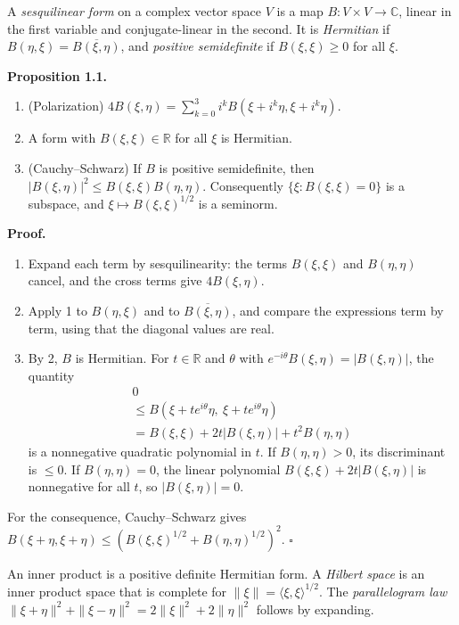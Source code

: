 \documentclass[
  english,
  11pt,
  a4paper,
]{article}
\providecommand{\tightlist}{%
  \setlength{\itemsep}{0pt}\setlength{\parskip}{0pt}}
\begin{document}
A \emph{sesquilinear form} on a complex vector space \(V\) is a map
\(B:V\times V\to\mathbb C\), linear in the first variable and
conjugate-linear in the second. It is \emph{Hermitian} if
\(B(\eta,\xi)=\overline{B(\xi,\eta)}\), and \emph{positive semidefinite}
if \(B(\xi,\xi)\ge0\) for all \(\xi\).

\textbf{Proposition 1.1.}

\begin{enumerate}
\tightlist
\item
  (Polarization)
  \(4B(\xi,\eta)=\sum_{k=0}^3i^kB(\xi+i^k\eta,\xi+i^k\eta)\).
\item
  A form with \(B(\xi,\xi)\in\mathbb R\) for all \(\xi\) is Hermitian.
\item
  (Cauchy--Schwarz) If \(B\) is positive semidefinite, then
  \(|B(\xi,\eta)|^2\le B(\xi,\xi)B(\eta,\eta)\). Consequently
  \(\{\xi:B(\xi,\xi)=0\}\) is a subspace, and
  \(\xi\mapsto B(\xi,\xi)^{1/2}\) is a seminorm.
\end{enumerate}

\textbf{Proof.}

\begin{enumerate}
\tightlist
\item
  Expand each term by sesquilinearity: the terms \(B(\xi,\xi)\) and
  \(B(\eta,\eta)\) cancel, and the cross terms give \(4B(\xi,\eta)\).
\item
  Apply 1 to \(B(\eta,\xi)\) and to \(\overline{B(\xi,\eta)}\), and
  compare the expressions term by term, using that the diagonal values
  are real.
\item
  By 2, \(B\) is Hermitian. For \(t\in\mathbb R\) and \(\theta\) with
  \(e^{-i\theta}B(\xi,\eta)=|B(\xi,\eta)|\), the quantity
  \[\begin{gathered}
  0\\
  \le B(\xi+te^{i\theta}\eta,\ \xi+te^{i\theta}\eta)\\
  =B(\xi,\xi)+2t|B(\xi,\eta)|+t^2B(\eta,\eta)
  \end{gathered}\] is a nonnegative quadratic polynomial in \(t\). If
  \(B(\eta,\eta)>0\), its discriminant is \(\le0\). If
  \(B(\eta,\eta)=0\), the linear polynomial
  \(B(\xi,\xi)+2t|B(\xi,\eta)|\) is nonnegative for all \(t\), so
  \(|B(\xi,\eta)|=0\).
\end{enumerate}

For the consequence, Cauchy--Schwarz gives
\(B(\xi+\eta,\xi+\eta)\le(B(\xi,\xi)^{1/2}+B(\eta,\eta)^{1/2})^2\).
\(\square\)

An inner product is a positive definite Hermitian form. A \emph{Hilbert
space} is an inner product space that is complete for
\(\|\xi\|=\langle\xi,\xi\rangle^{1/2}\). The \emph{parallelogram law}
\(\|\xi+\eta\|^2+\|\xi-\eta\|^2=2\|\xi\|^2+2\|\eta\|^2\) follows by
expanding.
\end{document}
